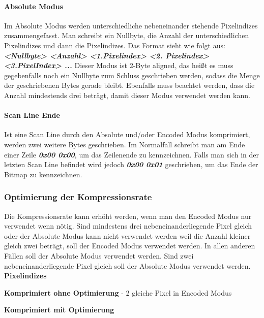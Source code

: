\documentclass[course=erap]{aspdoc}
\begin{document}
\paragraph{Absolute Modus}
Im Absolute Modus werden unterschiedliche nebeneinander stehende Pixelindizes zusammengefasst. Man schreibt ein Nullbyte, die Anzahl der unterschiedlichen Pixelindizes und dann die Pixelindizes. Das Format sieht wie folgt aus:\newline
\textbf{\textit{<Nullbyte> <Anzahl> <1.Pixelindex> <2. Pixelindex> <3.PixelIndex> ...}}\newline
Dieser Modus ist 2-Byte aligned, das heißt es muss gegebenfalls noch ein Nullbyte zum Schluss geschrieben werden, sodass die Menge der geschriebenen Bytes gerade bleibt. Ebenfalls muss beachtet werden, dass die Anzahl mindestends drei beträgt, damit dieser Modus verwendet werden kann.

\paragraph{Scan Line Ende}
Ist eine Scan Line durch den Absolute und/oder Encoded Modus komprimiert, werden zwei weitere Bytes geschrieben. Im Normalfall schreibt man am Ende einer Zeile \textbf{\textit{0x00 0x00}}, um das Zeilenende zu kennzeichnen. Falls man sich in der letzten Scan Line befindet wird jedoch \textbf{\textit{0x00 0x01}} geschrieben, um das Ende der Bitmap zu kennzeichnen.

\subsubsection{Optimierung der Kompressionsrate}
\label{sec:Optimierung}
Die Kompressionsrate kann erhöht werden, wenn man den Encoded Modus nur verwendet wenn nötig. Sind mindestens drei nebeneinanderliegende Pixel gleich oder der Absolute Modus kann nicht verwendet werden weil die Anzahl kleiner gleich zwei beträgt, soll der Encoded Modus verwendet werden. In allen anderen Fällen soll der Absolute Modus verwendet werden. Sind zwei nebeneinanderliegende Pixel gleich soll der Absolute Modus verwendet werden.
\newline
\newline
\textbf{Pixelindizes}
\vspace*{-2mm}

\textbf{Komprimiert ohne Optimierung} - 2 gleiche Pixel in Encoded Modus
\vspace*{-2mm}

\textbf{Komprimiert mit Optimierung}
\vspace*{-2mm}

\end{document}
